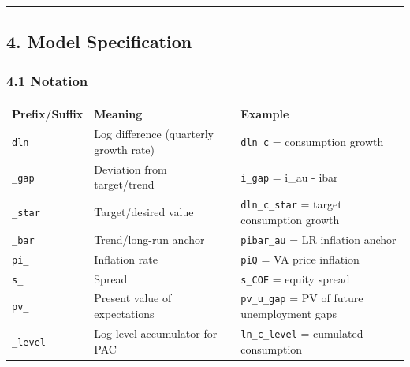 \documentclass[
]{article}
\newcounter{none} %
\begin{document}
\begin{center}\rule{0.5\linewidth}{0.5pt}\end{center}

\subsection{4. Model Specification}\label{model-specification}

\subsubsection{4.1 Notation}\label{notation}

{\def\LTcaptype{none} %
\begin{longtable}[]{@{}
  >{\raggedright\arraybackslash}p{}
  >{\raggedright\arraybackslash}p{}
  >{\raggedright\arraybackslash}p{}@{}}
\toprule\noalign{}
\begin{minipage}[b]{\linewidth}\raggedright
Prefix/Suffix
\end{minipage} & \begin{minipage}[b]{\linewidth}\raggedright
Meaning
\end{minipage} & \begin{minipage}[b]{\linewidth}\raggedright
Example
\end{minipage} \\
\midrule\noalign{}
\endhead
\bottomrule\noalign{}
\endlastfoot
\texttt{dln\_} & Log difference (quarterly growth rate) &
\texttt{dln\_c} = consumption growth \\
\texttt{\_gap} & Deviation from target/trend & \texttt{i\_gap} = i\_au -
ibar \\
\texttt{\_star} & Target/desired value & \texttt{dln\_c\_star} = target
consumption growth \\
\texttt{\_bar} & Trend/long-run anchor & \texttt{pibar\_au} = LR
inflation anchor \\
\texttt{pi\_} & Inflation rate & \texttt{piQ} = VA price inflation \\
\texttt{s\_} & Spread & \texttt{s\_COE} = equity spread \\
\texttt{pv\_} & Present value of expectations & \texttt{pv\_u\_gap} = PV
of future unemployment gaps \\
\texttt{\_level} & Log-level accumulator for PAC & \texttt{ln\_c\_level}
= cumulated consumption \\
\end{longtable}
}
\end{document}

